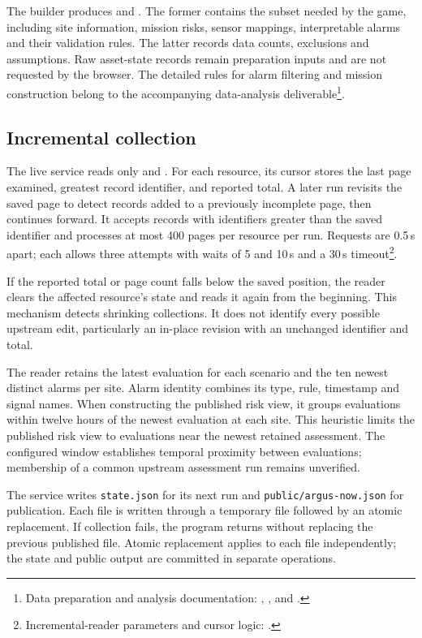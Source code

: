 \documentclass[10pt,a4paper]{article}
\begin{document}
The builder produces  and . The former contains the subset needed by the game, including site information, mission risks, sensor mappings, interpretable alarms and their validation rules. The latter records data counts, exclusions and assumptions. Raw asset-state records remain preparation inputs and are not requested by the browser. The detailed rules for alarm filtering and mission construction belong to the accompanying data-analysis deliverable\footnote{Data preparation and analysis documentation: , , and .}.

\subsection{Incremental collection}
The live service reads only  and . For each resource, its cursor stores the last page examined, greatest record identifier, and reported total. A later run revisits the saved page to detect records added to a previously incomplete page, then continues forward. It accepts records with identifiers greater than the saved identifier and processes at most 400 pages per resource per run. Requests are 0.5\,s apart; each allows three attempts with waits of 5 and 10\,s and a 30\,s timeout\footnote{Incremental-reader parameters and cursor logic: .}.

If the reported total or page count falls below the saved position, the reader clears the affected resource's state and reads it again from the beginning. This mechanism detects shrinking collections. It does not identify every possible upstream edit, particularly an in-place revision with an unchanged identifier and total.

The reader retains the latest evaluation for each scenario and the ten newest distinct alarms per site. Alarm identity combines its type, rule, timestamp and signal names. When constructing the published risk view, it groups evaluations within twelve hours of the newest evaluation at each site. This heuristic limits the published risk view to evaluations near the newest retained assessment. The configured window establishes temporal proximity between evaluations; membership of a common upstream assessment run remains unverified.

The service writes \texttt{state.json} for its next run and \texttt{public/argus-now.json} for publication. Each file is written through a temporary file followed by an atomic replacement. If collection fails, the program returns without replacing the previous published file. Atomic replacement applies to each file independently; the state and public output are committed in separate operations.
\end{document}
